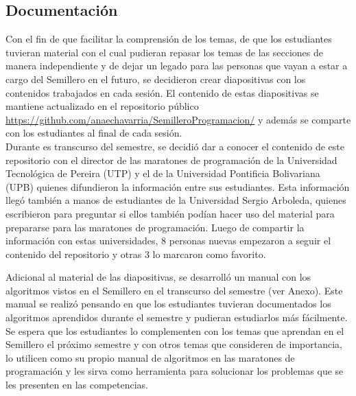 \documentclass[conference]{IEEEtran}
\begin{document}
\subsection{Documentación}
Con el fin de que facilitar la comprensión de los temas, de que los estudiantes tuvieran material con el cual pudieran repasar los temas de las secciones de manera independiente y de dejar un legado para las personas que vayan a estar a cargo del Semillero en el futuro, se decidieron crear diapositivas con los contenidos trabajados en cada sesión. El contenido de estas diapositivas se mantiene actualizado en el repositorio público \url{https://github.com/anaechavarria/SemilleroProgramacion/} y además se comparte con los estudiantes al final de cada sesión.\\
Durante es transcurso del semestre, se decidió dar a conocer el contenido de este repositorio con el director de las maratones de programación de la Universidad Tecnológica de Pereira (UTP) y el de la Universidad Pontificia Bolivariana (UPB) quienes difundieron la información entre sus estudiantes. Esta información llegó también a manos de estudiantes de la Universidad Sergio Arboleda, quienes escribieron para preguntar si ellos también podían hacer uso del material para prepararse para las maratones de programación. Luego de compartir la información con estas universidades, 8 personas nuevas empezaron a seguir el contenido del repositorio y otras 3 lo marcaron como favorito.

Adicional al material de las diapositivas, se desarrolló un manual con los algoritmos vistos en el Semillero en el transcurso del semestre (ver Anexo). Este manual se realizó pensando en que los estudiantes tuvieran documentados los algoritmos aprendidos durante el semestre y pudieran estudiarlos más fácilmente. Se espera que los estudiantes lo complementen con los temas que aprendan en el Semillero el próximo semestre y con otros temas que consideren de importancia, lo utilicen como su propio manual de algoritmos en las maratones de programación y les sirva como herramienta para solucionar los problemas que se les presenten en las competencias.
\end{document}
